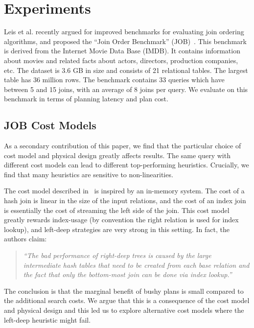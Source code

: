 \section{Experiments}
Leis et al. recently argued for improved benchmarks for evaluating join ordering algorithms, and proposed the ``Join Order Benchmark'' (JOB)~\cite{leis2015good}.
This benchmark is derived from the Internet Movie Data Base
(IMDB). It contains information
about movies and related facts about actors, directors,
production companies, etc. 
The dataset is 3.6 GB in size and consists of 21 relational tables.
The largest table has
36 million rows.
The benchmark contains 33 queries which have between 5 and 15 joins, with an average of 8 joins per query.  
We evaluate \sys on this benchmark in terms of planning latency and plan cost.


\subsection{JOB Cost Models}
As a secondary contribution of this paper, we find that the particular choice of cost model and physical design greatly affects results.
The same query with different cost models can lead to different top-performing heuristics.
Crucially, we find that many heuristics are sensitive to non-linearities.

The cost model described in~\cite{leis2015good} is inspired by an in-memory system. The cost of a hash join is linear in the size of the input relations, and the cost of an index join is essentially the cost of streaming the left side of the join.
This cost model greatly rewards index-usage (by convention the right relation is used for index lookup), and left-deep strategies are very strong in this setting. In fact, the authors claim: 
\begin{quote}
\emph{``The bad performance of right-deep trees is caused by the large intermediate hash tables that need to be created from each base relation and the fact that only the bottom-most join can
be done via index lookup.''}~\cite{leis2015good} 
\end{quote}
The conclusion is that the marginal benefit of bushy plans is small compared to the additional search costs.
We argue that this is a consequence of the cost model and physical design and this led us to explore alternative cost models where the left-deep heuristic might fail.

